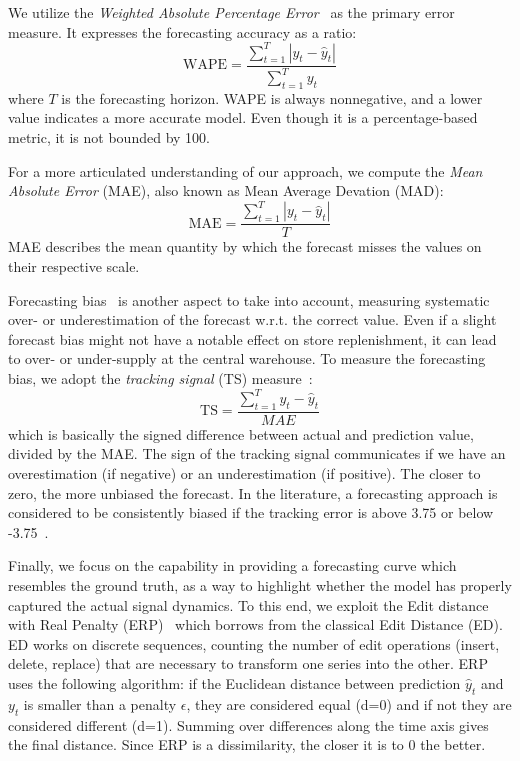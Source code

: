 \documentclass{article}
\begin{document}
We utilize the \emph{Weighted  Absolute Percentage Error}~\cite{hyndman2008forecasting} as the primary error measure. It expresses the forecasting accuracy as a ratio:
\begin{equation}
    \text{WAPE} = \frac{\sum_{t=1}^{T}|y_t-\hat{y}_t|}{\sum_{t=1}^{T}y_t}
\end{equation}
where $T$ is the forecasting horizon. WAPE is always nonnegative, and a lower value indicates a more accurate model. Even though it is a percentage-based metric, it is not bounded by 100.

For a more articulated understanding of our approach, we compute the \emph{Mean Absolute Error} (MAE), also known as Mean Average Devation (MAD):
\begin{equation}
    \text{MAE} = \frac{\sum_{t=1}^{T}|y_t-\hat{y}_t|}{T}
\end{equation}
MAE describes the mean quantity by which the forecast misses the values on their respective scale.

Forecasting bias~\cite{brown2004smoothing} is another aspect to take into account, measuring systematic over- or underestimation of the forecast w.r.t. the correct value. Even if a slight forecast bias might not have a notable effect on store replenishment, it can lead to over- or under-supply at the central warehouse. To measure the forecasting bias, we adopt the \emph{tracking signal} (TS) measure~\cite{brown2004smoothing,nahmias2009production}:
\begin{equation}
    \text{TS} = \frac{\sum_{t=1}^{T} y_t-\hat{y}_t}{MAE}
\end{equation}
which is basically the signed difference between actual and prediction value, divided by the MAE. The sign of the tracking signal communicates if we have an overestimation (if negative) or an underestimation (if positive). The closer to zero, the more unbiased the forecast. In the literature, a forecasting approach is considered to be consistently biased if the tracking error is above 3.75 or below -3.75~\cite{brown2004smoothing,nahmias2009production}.

Finally, we focus on the capability in providing a forecasting curve which resembles the ground truth, as a way to highlight whether the model has properly captured the actual signal dynamics. To this end, we exploit the Edit distance with Real Penalty (ERP)~\cite{chen2004marriage} which borrows from the classical Edit Distance (ED). ED works on discrete sequences, counting the number of edit operations (insert, delete, replace) that are necessary to transform one series into the other. ERP uses the following algorithm: if the Euclidean distance between prediction $\hat{y}_t$ and $y_t$ is smaller than a penalty $\epsilon$, they are considered equal (d=0) and if not they are considered different (d=1). Summing over differences along the time axis gives the final distance. Since ERP is a dissimilarity, the closer it is to 0 the better.
\end{document}
